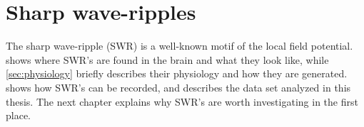 \chapter{Sharp wave-ripples}
\label{ch:SWR}

The sharp wave-ripple (SWR) is a well-known motif of the local field potential.  shows where SWR's are found in the brain and what they look like, while \cref{sec:physiology} briefly describes their physiology and how they are generated.  shows how SWR's can be recorded, and describes the data set analyzed in this thesis. The next chapter explains why SWR's are worth investigating in the first place.




